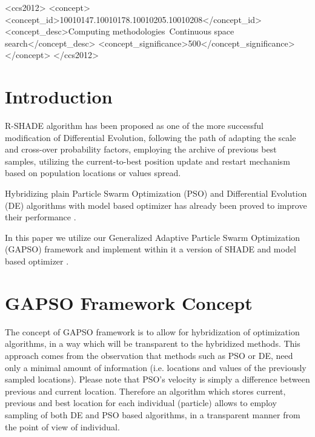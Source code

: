 \documentclass[sigconf]{acmart}
\begin{document}
%
%
 \begin{CCSXML}
<ccs2012>
<concept>
<concept_id>10010147.10010178.10010205.10010208</concept_id>
<concept_desc>Computing methodologies~Continuous space search</concept_desc>
<concept_significance>500</concept_significance>
</concept>
</ccs2012>
\end{CCSXML}





\maketitle


\section{Introduction}

R-SHADE \cite{Tanabe2014} algorithm has been proposed as one of the more successful
modification of Differential Evolution, following the path of adapting the scale
and cross-over probability factors, employing the archive of previous best samples,
utilizing the current-to-best position update and restart mechanism based on population
locations or values spread.

Hybridizing plain Particle Swarm Optimization (PSO) and Differential Evolution (DE)
algorithms with model based optimizer has already been proved
to improve their performance \cite{zaborski2019generalized,zaborski2020analysis,Okulewicz2020}.

In this paper we utilize our Generalized Adaptive Particle Swarm Optimization (GAPSO) framework
\cite{ulinski2018generalized,Okulewicz2020}
and implement within it a version of SHADE \cite{Tanabe2014} and model based optimizer \cite{zaborski2020analysis}.
%
\section{GAPSO Framework Concept}
The concept of GAPSO framework is to allow for hybridization of optimization algorithms,
in a way which will be transparent to the hybridized methods.
This approach comes from the observation that methods such as PSO or DE,
need only a minimal amount of information (i.e. locations and values
of the previously sampled locations). Please note that PSO's velocity
is simply a difference between previous and current location.
Therefore an algorithm which stores current, previous and best location
for each individual (particle) allows to employ sampling of both DE and PSO
based algorithms, in a transparent manner from the point of view of individual.
\end{document}
